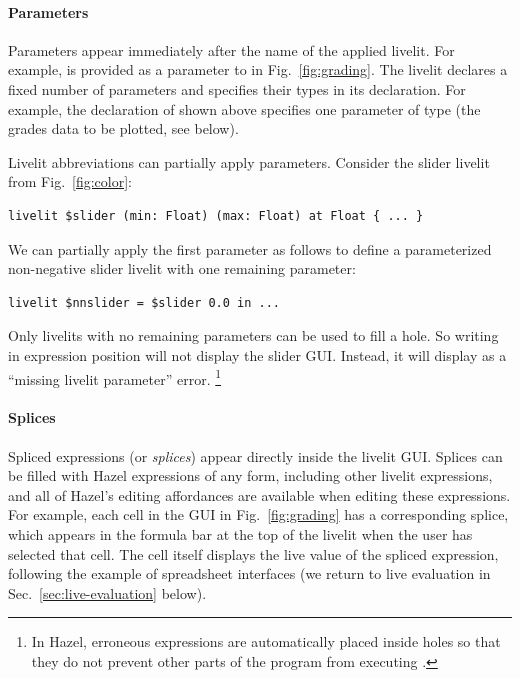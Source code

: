 \paragraph{Parameters}\label{sec:parameterization} Parameters appear immediately after the name of the applied livelit.
For example,  is provided as a parameter to  in Fig.~\ref{fig:grading}.
The livelit declares a fixed number of parameters and specifies their types in its declaration.
For example, the declaration of  shown above specifies one parameter of type 
(the grades data to be plotted, see below).

Livelit abbreviations can partially apply parameters. Consider the slider livelit
from Fig.~\ref{fig:color}:
\begin{lstlisting}[numbers=none]
livelit $slider (min: Float) (max: Float) at Float { ... }
\end{lstlisting}
We can partially apply the first parameter as follows to define a parameterized non-negative slider livelit with one remaining parameter:
\begin{lstlisting}[numbers=none]
livelit $nnslider = $slider 0.0 in ...
\end{lstlisting}
Only livelits with no remaining parameters can be used to fill a hole.
So writing  in expression position will not display the slider GUI. Instead, it will display as a ``missing livelit parameter'' error.%
\footnote{\label{footnote:typing}In Hazel, erroneous expressions are automatically placed inside holes so that they do not prevent other parts of the program from executing
\cite{HazelnutLive}.}

\paragraph{Splices}\label{sec:splices}
Spliced expressions (or \emph{splices}) appear directly inside the livelit GUI.
Splices can be filled with Hazel expressions of any form, including other livelit expressions,
and all of Hazel's editing affordances are available when editing these expressions.
For example, each cell in the  GUI in Fig.~\ref{fig:grading}
has a corresponding splice, which appears in the formula bar at the top of the livelit
when the user has selected that cell.
The cell itself displays the live value of the spliced expression,
following the example of spreadsheet interfaces
(we return to live evaluation in Sec.~\ref{sec:live-evaluation} below).


